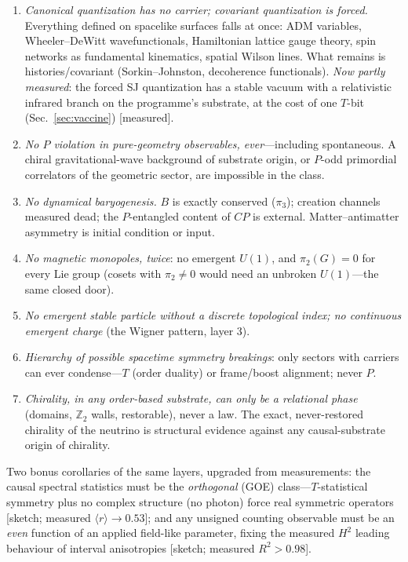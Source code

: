 \documentclass[aps,prd,reprint,nofootinbib,superscriptaddress,floatfix]{revtex4-2}
\theoremstyle{definition}
\begin{document}
\begin{enumerate}
\item[P1.] \emph{Canonical quantization has no carrier; covariant quantization is
forced.} Everything defined on spacelike surfaces falls at once: ADM variables,
Wheeler--DeWitt wavefunctionals, Hamiltonian lattice gauge theory, spin networks as
fundamental kinematics, spatial Wilson lines. What remains is histories/covariant
(Sorkin--Johnston, decoherence functionals). \emph{Now partly measured}: the forced SJ
quantization has a stable vacuum with a relativistic infrared branch on the programme's
substrate, at the cost of one $T$-bit (Sec.~\ref{sec:vaccine}) [measured].
\item[P2.] \emph{No $P$ violation in pure-geometry observables, ever}---including
spontaneous. A chiral gravitational-wave background of substrate origin, or $P$-odd
primordial correlators of the geometric sector, are impossible in the class.
\item[P3.] \emph{No dynamical baryogenesis.} $B$ is exactly conserved ($\pi_3$); creation
channels measured dead; the $P$-entangled content of $CP$ is external. Matter--antimatter
asymmetry is initial condition or input.
\item[P4.] \emph{No magnetic monopoles, twice}: no emergent $U(1)$, and $\pi_2(G)=0$ for
every Lie group (cosets with $\pi_2\neq0$ would need an unbroken $U(1)$---the same closed
door).
\item[P5.] \emph{No emergent stable particle without a discrete topological index; no
continuous emergent charge} (the Wigner pattern, layer 3).
\item[P6.] \emph{Hierarchy of possible spacetime symmetry breakings}: only sectors with
carriers can ever condense---$T$ (order duality) or frame/boost alignment; never $P$.
\item[P7.] \emph{Chirality, in any order-based substrate, can only be a relational
phase} (domains, $\mathbb{Z}_2$ walls, restorable), never a law. The exact, never-restored
chirality of the neutrino is structural evidence against any causal-substrate origin of
chirality.
\end{enumerate}

Two bonus corollaries of the same layers, upgraded from measurements: the causal
spectral statistics must be the \emph{orthogonal} (GOE) class---$T$-statistical symmetry
plus no complex structure (no photon) force real symmetric operators [sketch; measured
$\langle r\rangle\to0.53$]; and any unsigned counting observable must be an \emph{even}
function of an applied field-like parameter, fixing the measured $H^2$ leading behaviour
of interval anisotropies [sketch; measured $R^2>0.98$].
\end{document}
